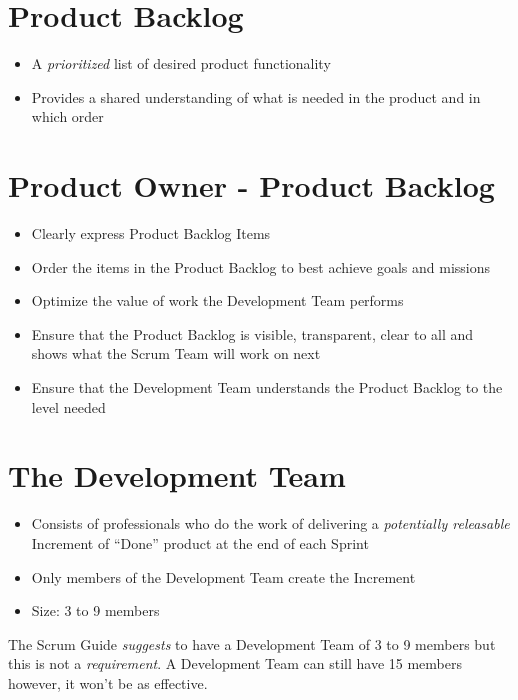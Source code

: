 \documentclass[a4paper,11pt,twocolumn]{article}
\begin{document}
\section*{Product Backlog}
\begin{itemize}
	\item A \textit{prioritized} list of desired product functionality
	\item Provides a shared understanding of what is needed in the product and in which order
\end{itemize}

\section*{Product Owner - Product Backlog}
\begin{itemize}
    \item Clearly express Product Backlog Items
    \item Order the items in the Product Backlog to best achieve goals and missions
    \item Optimize the value of work the Development Team performs
    \item Ensure that the Product Backlog is visible, transparent, clear to all and shows what the Scrum Team will work on next
    \item Ensure that the Development Team understands the Product Backlog to the level needed
\end{itemize}

\section*{The Development Team}
\begin{itemize}
	\item Consists of professionals who do the work of delivering a \textit{potentially releasable} Increment of ``Done'' product at the end of each Sprint
	\item Only members of the Development Team create the Increment
    \item Size: 3 to 9 members
\end{itemize}

\begin{tcolorbox}[colback=black!8!white,colframe=gray!50!black,title=Note,sharp corners,fonttitle=\normalsize\bfseries,fontupper=\normalsize,left=0.7em,right=0.7em]
	The Scrum Guide \textit{suggests} to have a Development Team of 3 to 9 members but this is not a \textit{requirement}. A Development Team can still have 15 members however, it won't be as effective.
\end{tcolorbox}
\end{document}
